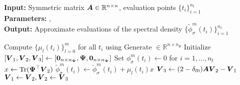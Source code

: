 \hspace*{\algorithmicindent} \textbf{Input:} Symmetric matrix $\boldsymbol{A} \in \mathbb{R}^{n \times n}$, evaluation points $\{t_i\}_{i=1}^{n_t}$ \\
\hspace*{\algorithmicindent} \textbf{Parameters:} ,  \\
\hspace*{\algorithmicindent} \textbf{Output:} Approximate evaluations of the spectral density $\{\widetilde{\phi}_{\sigma}^m(t_i)\}_{i=1}^{n_t}$
\begin{algorithmic}[1]
    \State Compute $\{\mu_l(t_i)\}_{l=0}^m$ for all $t_i$ using 
    \State Generate  $\in \mathbb{R}^{n \times n_{\Psi}}$
    \State Initialize $[\boldsymbol{V}_1, \boldsymbol{V}_2, \boldsymbol{V}_3] \gets [\boldsymbol{0}_{n \times n_{\boldsymbol{\Psi}}}, \boldsymbol{\Psi}, \boldsymbol{0}_{n \times n_{\boldsymbol{\Psi}}}]$
    \State Set ${\phi}_{\sigma}^m(t_i) \gets 0$ for $i=1,\dots,n_t$
      \State $x \gets \operatorname{Tr}(\boldsymbol{\Psi}^{\top} \boldsymbol{V}_2)$
        \State $\widetilde{\phi}_{\sigma}^m(t_i) \gets \widetilde{\phi}_{\sigma}^m(t_i) + \mu_l(t_i) x$
      \EndFor
      \State $\boldsymbol{V}_3 \gets (2 - \delta_{l0}) \boldsymbol{A} \boldsymbol{V}_2 - \boldsymbol{V}_1$ 
      \State $\boldsymbol{V}_1 \gets \boldsymbol{V}_2, \boldsymbol{V}_2 \gets \boldsymbol{V}_3$
    \EndFor
\end{algorithmic}
